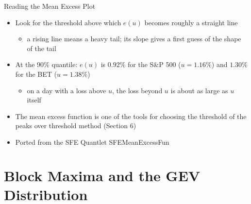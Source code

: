 \begin{frame}{Reading the Mean Excess Plot}
\itemsize{\small}
\begin{itemize}
    \item Look for the threshold above which $e(u)$ becomes roughly a straight line
    \begin{itemize}
        \item a rising line means a heavy tail; its slope gives a first guess of the shape of the tail
    \end{itemize}
    \item At the 90\% quantile: $e(u)$ is $0.92\%$ for the S\&P 500 ($u = 1.16\%$) and $1.30\%$ for the BET ($u = 1.38\%$)
    \begin{itemize}
        \item on a day with a loss above $u$, the loss beyond $u$ is about as large as $u$ itself
    \end{itemize}
    \item The mean excess function is one of the tools for choosing the threshold of the peaks over threshold method (Section 6)
    \item Ported from the SFE Quantlet SFEMeanExcessFun
\end{itemize}
\end{frame}


\section{Block Maxima and the GEV Distribution}

